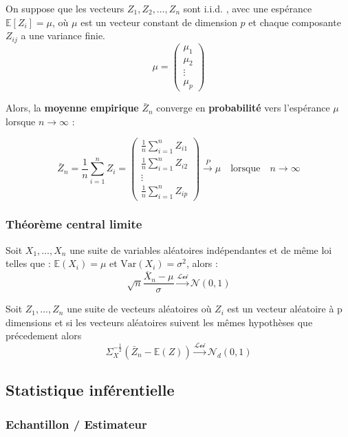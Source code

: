 \documentclass[
  letterpaper,
  DIV=11,
  numbers=noendperiod]{scrartcl}
\begin{document}
On suppose que les vecteurs \(Z_1, Z_2, \dots, Z_n\) sont i.i.d. , avec
une espérance \(\mathbb{E}[Z_i] = \mu\), où \(\mu\) est un vecteur
constant de dimension \(p\) et chaque composante \(Z_{ij}\) a une
variance finie.
\[\mu = \begin{pmatrix} \mu_1 \\ \mu_2 \\ \vdots \\ \mu_p \end{pmatrix}\]

Alors, la \textbf{moyenne empirique} \(\bar{Z}_n\) converge en
\textbf{probabilité} vers l'espérance \(\mu\) lorsque \(n \to \infty\) :

\[\bar{Z}_n  = \frac{1}{n} \sum_{i=1}^{n} Z_i = \begin{pmatrix} \frac{1}{n} \sum_{i=1}^{n} Z_{i1} \\ \frac{1}{n} \sum_{i=1}^{n} Z_{i2} \\ \vdots \\ \frac{1}{n} \sum_{i=1}^{n} Z_{ip} \end{pmatrix} \xrightarrow{P} \mu \quad \text{lorsque} \quad n \to \infty\]

\subsubsection{Théorème central
limite}\label{thuxe9oruxe8me-central-limite}

Soit \(X_1, \ldots, X_n\) une suite de variables aléatoires
indépendantes et de même loi telles que : \(\mathbb{E}(X_i) = \mu\) et
\(\text{Var}(X_i) = \sigma^2\), alors :
\[\sqrt{n}\frac{\overline{X}_n - \mu}{\sigma} \xrightarrow{\mathcal{Loi}} \mathcal{N}(0, 1)\]

Soit \(Z_1,\ldots, Z_n\) une suite de vecteurs aléatoires où \(Z_i\) est
un vecteur aléatoire à p dimensions et si les vecteurs aléatoires
suivent les mêmes hypothèses que précedement alors
\[\Sigma_X^{-\frac{1}{2}}(\bar{Z}_n-\mathbb{E}(Z) )\xrightarrow{\mathcal{Loi}} \mathcal{N}_d(0, 1)\]

\newpage

\subsection{Statistique
inférentielle}\label{statistique-infuxe9rentielle}

\subsubsection{Echantillon / Estimateur}\label{echantillon-estimateur}
\end{document}
